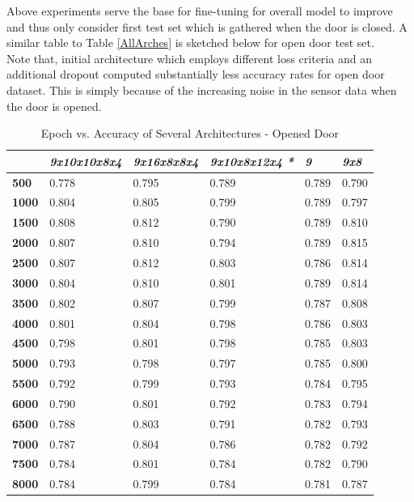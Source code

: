 \documentclass[conference]{IEEEtran}
\begin{document}
Above experiments serve the base for fine-tuning for overall model to improve and thus only consider first test set which is gathered when the door is closed. A similar table to Table \ref{AllArches} is sketched below for open door test set.\\

Note that, initial architecture which employs different loss criteria and an additional dropout computed  substantially less accuracy rates for open door dataset. This is simply because of the increasing noise in the sensor data when the door is opened.

\vfill
\begin{table}[H]
	\centering
	\caption{Epoch vs. Accuracy of Several Architectures - Opened Door}
	\label{AllArches2}
	\begin{tabular}{|l|l|l|l|l|l|}
		\hline
		& \textit{9x10x10x8x4} 
		& \textit{9x16x8x8x4}
		& \textit{9x10x8x12x4 \textbf{*}}
		& \textit{9}
		& \textit{9x8}\\ \hline
		\textbf{500} & 0.778 & 0.795 & 0.789 & 0.789 & 0.790\\ \hline
		\textbf{1000} & 0.804 & 0.805 & 0.799 & 0.789 & 0.797\\
		\hline
		\textbf{1500} & 0.808 & 0.812 & 0.790 & 0.789 & 0.810\\ \hline
		\textbf{2000} & 0.807& 0.810 & 0.794 & 0.789 & \cellcolor{green!25}0.815\\ \hline
		\textbf{2500} & 0.807 & 0.812 & 0.803 &  0.786 & 0.814\\
		\hline
		\textbf{3000} & 0.804 & 0.810 & 0.801 & 0.789 & 0.814\\ \hline
		\textbf{3500} & 0.802 & 0.807 & 0.799 & 0.787 & 0.808\\ \hline
		\textbf{4000} & 0.801 & 0.804 & 0.798 & 0.786 & 0.803\\ \hline
		\textbf{4500} & 0.798 & 0.801 & 0.798 & 0.785 & 0.803\\ \hline
		\textbf{5000} & 0.793 &  0.798 & 0.797 & 0.785 & 0.800\\ \hline
		\textbf{5500} & 0.792 & 0.799 & 0.793 & 0.784 & 0.795\\ \hline
		\textbf{6000} & 0.790 & 0.801 & 0.792 & 0.783 &  0.794\\ \hline 
		\textbf{6500} & 0.788 & 0.803 & 0.791 & 0.782 & 0.793\\ \hline
		\textbf{7000} & 0.787 & 0.804 & 0.786 & 0.782 & 0.792\\ \hline 
		\textbf{7500} & 0.784 & 0.801 & 0.784 & 0.782 & 0.790\\ \hline
		\textbf{8000} & 0.784 & 0.799 & 0.784 & 0.781 & 0.787\\ \hline
	\end{tabular}
\end{table}
\end{document}
